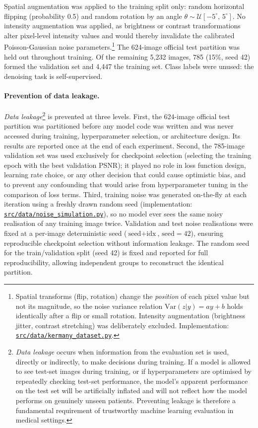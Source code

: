 \documentclass[12pt, a4paper, twoside, openright]{book}
\begin{document}
Spatial augmentation was applied to the training split only: random horizontal flipping (probability 0.5) and random rotation by an angle $\theta \sim \mathcal{U}[-5^\circ,\,5^\circ]$. No intensity augmentation was applied, as brightness or contrast transformations alter pixel-level intensity values and would thereby invalidate the calibrated Poisson-Gaussian noise parameters.\footnote{Spatial transforms (flip, rotation) change the \emph{position} of each pixel value but not its magnitude, so the noise variance relation $\mathrm{Var}(z|y) = ay + b$ holds identically after a flip or small rotation. Intensity augmentation (brightness jitter, contrast stretching) was deliberately excluded. Implementation: \href{https://github.com/teklesam/ppva_hformer_codebase/blob/main/src/data/kermany_dataset.py}{\texttt{src/data/kermany\_dataset.py}}.} The 624-image official test partition was held out throughout training. Of the remaining 5,232 images, 785 (15\%, seed 42) formed the validation set and 4,447 the training set. Class labels were unused: the denoising task is self-supervised.

\paragraph{Prevention of data leakage.} \emph{Data leakage}\footnote{\emph{Data leakage} occurs when information from the evaluation set is used, directly or indirectly, to make decisions during training. If a model is allowed to see test-set images during training, or if hyperparameters are optimised by repeatedly checking test-set performance, the model's apparent performance on the test set will be artificially inflated and will not reflect how the model performs on genuinely unseen patients. Preventing leakage is therefore a fundamental requirement of trustworthy machine learning evaluation in medical settings.} is prevented at three levels. First, the 624-image official test partition was partitioned before any model code was written and was never accessed during training, hyperparameter selection, or architecture design. Its results are reported once at the end of each experiment. Second, the 785-image validation set was used exclusively for checkpoint selection (selecting the training epoch with the best validation PSNR); it played no role in loss function design, learning rate choice, or any other decision that could cause optimistic bias, and to prevent any confounding that would arise from hyperparameter tuning in the comparison of loss terms. Third, training noise was generated on-the-fly at each iteration using a freshly drawn random seed (implementation: \href{https://github.com/teklesam/ppva_hformer_codebase/blob/main/src/data/noise_simulation.py}{\texttt{src/data/noise\_simulation.py}}), so no model ever sees the same noisy realisation of any training image twice. Validation and test noise realisations were fixed at a per-image deterministic seed ($\text{seed} + \text{idx}$, $\text{seed}=42$), ensuring reproducible checkpoint selection without information leakage. The random seed for the train/validation split (seed 42) is fixed and reported for full reproducibility, allowing independent groups to reconstruct the identical partition.
\end{document}
